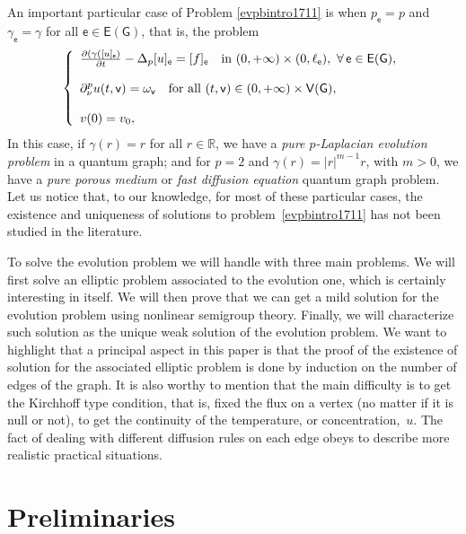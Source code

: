 \documentclass[reqno,12pt]{amsart}
\def\R{\mathbb R} %
\def\e{\mathsf{e}} 	%
\def\v{\mathsf{v}}	%
\newcommand{\G}{\mathsf{G}}	%
\newcommand{\V}{\mathsf{V}}	%
\newcommand{\E}{\mathsf{E}}	%
\numberwithin{equation}{section} %
\begin{document}
An important particular case of Problem \eqref{evpbintro1711} is when $p_\e = p$ and $\gamma_\e = \gamma$ for all $\e\in \E(\G)$,    that is, the problem
\begin{equation}\label{evproblem} \left\{\begin{array}{l}
\frac{\partial (\gamma([u]_\e)}{\partial t}-\Delta_{p} [u]_\e=[f]_\e\quad\hbox{in } (0,+\infty)\times(0,\ell_\e),\ \forall\, \e\in \E(\G),\\
\\
\displaystyle  \partial^{p}_\nu u(t,\v)={\omega_\v}   \quad\hbox{for all } (t,\v)\in (0,+\infty)\times \V(\G),
\\ \\ v(0)=v_0,
\end{array}\right.
\end{equation}
In this case, if  $\gamma(r) = r$ for all $r \in \R$, we have a  {\it pure  $p$-Laplacian evolution problem}  in a quantum graph;  and for $p=2$ and  $\gamma(r) = |r|^{m-1}r$, with $m>0$,  we have a {\it pure  porous medium} or {\it fast diffusion equation} quantum graph problem.  
Let us notice that, to our knowledge,   for most of these particular cases, the existence and uniqueness of solutions to  problem~\eqref{evpbintro1711} has not been studied  in the literature. 
 


 

 To solve the  evolution problem we will handle with three main problems. We  will first solve an elliptic problem associated to the evolution one, which is certainly interesting in itself. We will then prove that we can get a mild solution for the evolution problem using   nonlinear semigroup theory. Finally, we will characterize such solution as the unique weak solution of the evolution problem.
We want to highlight that a principal aspect in this paper is that the proof of the existence of solution   for the associated elliptic problem is done by induction on the number of edges of the graph. It is also worthy to mention  that the main difficulty is to get the Kirchhoff type condition, that is, fixed the flux on a vertex (no matter if it is null or not), to get the continuity   of the temperature, or concentration,~$u$. 
The fact of dealing with  different diffusion rules  on  each edge obeys to describe more realistic practical situations.  

 




\section{Preliminaries}
\end{document}

